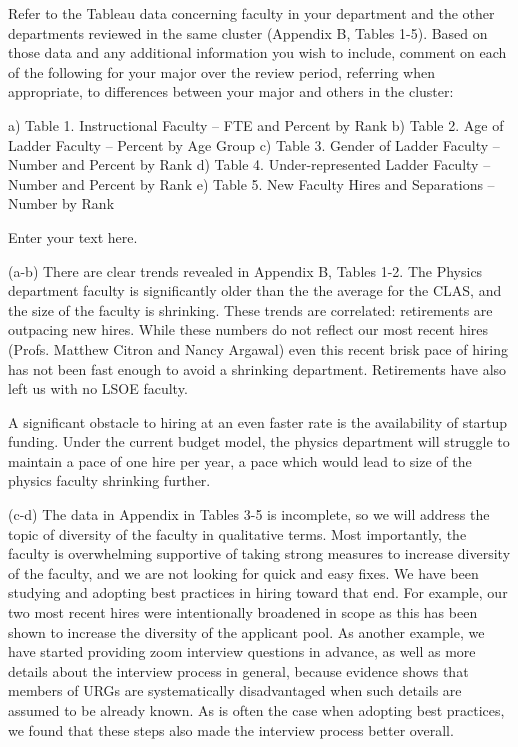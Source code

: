 \documentclass[12pt]{article}
\begin{document}
Refer to the Tableau data concerning faculty in your department and the other departments reviewed in the same cluster (Appendix B, Tables 1-5). Based on those data and any additional information you wish to include, comment on each of the following for your major over the review period, referring when appropriate, to differences between your major and others in the cluster:

    a) Table 1.  Instructional Faculty – FTE and Percent by Rank 
    b) Table 2.  Age of Ladder Faculty – Percent by Age Group 
    c) Table 3.  Gender of Ladder Faculty – Number and Percent by Rank 
    d) Table 4.  Under-represented Ladder Faculty – Number and Percent by Rank 
    e) Table 5.  New Faculty Hires and Separations – Number by Rank 

Enter your text here.

(a-b) There are clear trends revealed in Appendix B, Tables 1-2.  The Physics department faculty is significantly older than the the average for the CLAS, and the size of the faculty is shrinking.  These trends are correlated: retirements are outpacing new hires.  While these numbers do not reflect our most recent hires (Profs. Matthew Citron and Nancy Argawal) even this recent brisk pace of hiring has not been fast enough to avoid a shrinking department.  Retirements have also left us with no LSOE faculty.

A significant obstacle to hiring at an even faster rate is the availability of startup funding.  Under the current budget model, the physics department will struggle to maintain a pace of one hire per year, a pace which would lead to size of the physics faculty shrinking further.

(c-d) The data in Appendix in Tables 3-5 is incomplete, so we will address the topic of diversity of the faculty in qualitative terms.  Most importantly, the faculty is overwhelming supportive of taking strong measures to increase diversity of the faculty, and we are not looking for quick and easy fixes.  We have been studying and adopting best practices in hiring toward that end.  For example, our two most recent hires were intentionally broadened in scope as this has been shown to increase the diversity of the applicant pool.  As another example, we have started providing zoom interview questions in advance, as well as more details about the interview process in general, because evidence shows that members of URGs are systematically disadvantaged when such details are assumed to be already known.  As is often the case when adopting best practices, we found that these steps also made the interview process better overall. 
\end{document}
